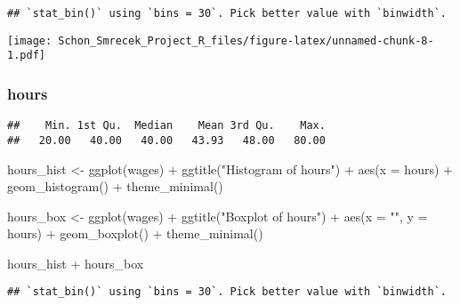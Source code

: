 \documentclass[
]{article}
\newenvironment{Shaded}{\begin{snugshade}}{\end{snugshade}}
\newcommand{\AttributeTok}[1]{\textcolor[rgb]{0.77,0.63,0.00}{#1}}
\newcommand{\FunctionTok}[1]{\textcolor[rgb]{0.00,0.00,0.00}{#1}}
\newcommand{\NormalTok}[1]{#1}
\newcommand{\OtherTok}[1]{\textcolor[rgb]{0.56,0.35,0.01}{#1}}
\newcommand{\SpecialCharTok}[1]{\textcolor[rgb]{0.00,0.00,0.00}{#1}}
\newcommand{\StringTok}[1]{\textcolor[rgb]{0.31,0.60,0.02}{#1}}
\begin{document}
\begin{verbatim}
## `stat_bin()` using `bins = 30`. Pick better value with `binwidth`.
\end{verbatim}

\texttt{[image: Schon\_Smrecek\_Project\_R\_files/figure-latex/unnamed-chunk-8-1.pdf]}

\hypertarget{hours}{%
\subsubsection{hours}\label{hours}}

\begin{Shaded}
\end{Shaded}

\begin{verbatim}
##    Min. 1st Qu.  Median    Mean 3rd Qu.    Max. 
##   20.00   40.00   40.00   43.93   48.00   80.00
\end{verbatim}

\begin{Shaded}
\begin{Highlighting}[]
\NormalTok{hours\_hist }\OtherTok{\textless{}{-}} \FunctionTok{ggplot}\NormalTok{(wages) }\SpecialCharTok{+} \FunctionTok{ggtitle}\NormalTok{(}\StringTok{"Histogram of hours"}\NormalTok{) }\SpecialCharTok{+} \FunctionTok{aes}\NormalTok{(}\AttributeTok{x =}\NormalTok{ hours) }\SpecialCharTok{+} \FunctionTok{geom\_histogram}\NormalTok{() }\SpecialCharTok{+} \FunctionTok{theme\_minimal}\NormalTok{()}

\NormalTok{hours\_box }\OtherTok{\textless{}{-}} \FunctionTok{ggplot}\NormalTok{(wages) }\SpecialCharTok{+} \FunctionTok{ggtitle}\NormalTok{(}\StringTok{"Boxplot of hours"}\NormalTok{) }\SpecialCharTok{+} \FunctionTok{aes}\NormalTok{(}\AttributeTok{x =} \StringTok{""}\NormalTok{, }\AttributeTok{y =}\NormalTok{ hours) }\SpecialCharTok{+} \FunctionTok{geom\_boxplot}\NormalTok{() }\SpecialCharTok{+} \FunctionTok{theme\_minimal}\NormalTok{()}

\NormalTok{hours\_hist }\SpecialCharTok{+}\NormalTok{ hours\_box}
\end{Highlighting}
\end{Shaded}

\begin{verbatim}
## `stat_bin()` using `bins = 30`. Pick better value with `binwidth`.
\end{verbatim}
\end{document}
